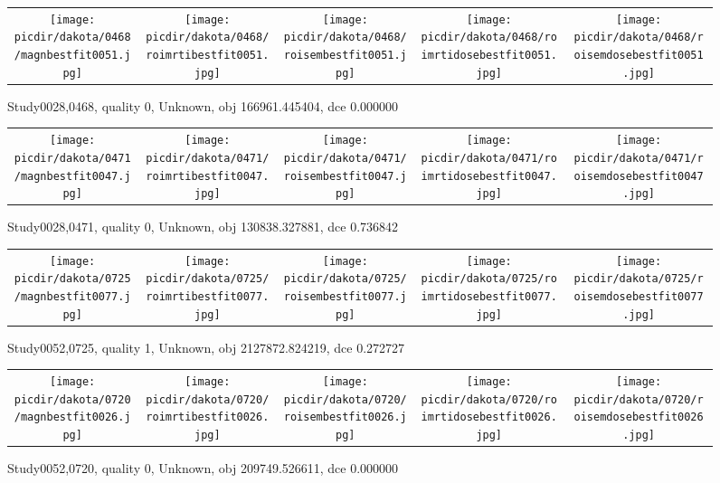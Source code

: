 \documentclass{article}
\newcommand{\picdir}{pdffig}
\begin{document}
\clearpage
\begin{figure} \begin{tabular}{ccccc} \scalebox{0.21}{\texttt{[image: \\picdir/dakota/0468/magnbestfit0051.jpg]}} & \scalebox{0.21}{\texttt{[image: \\picdir/dakota/0468/roimrtibestfit0051.jpg]}} & \scalebox{0.21}{\texttt{[image: \\picdir/dakota/0468/roisembestfit0051.jpg]}}  & \scalebox{0.21}{\texttt{[image: \\picdir/dakota/0468/roimrtidosebestfit0051.jpg]}} & \scalebox{0.21}{\texttt{[image: \\picdir/dakota/0468/roisemdosebestfit0051.jpg]}} \end{tabular} \caption{Study0028,0468, quality 0, Unknown, obj 166961.445404, dce 0.000000  } \label{Study00280468} \end{figure}
\begin{figure} \begin{tabular}{ccccc} \scalebox{0.21}{\texttt{[image: \\picdir/dakota/0471/magnbestfit0047.jpg]}} & \scalebox{0.21}{\texttt{[image: \\picdir/dakota/0471/roimrtibestfit0047.jpg]}} & \scalebox{0.21}{\texttt{[image: \\picdir/dakota/0471/roisembestfit0047.jpg]}}  & \scalebox{0.21}{\texttt{[image: \\picdir/dakota/0471/roimrtidosebestfit0047.jpg]}} & \scalebox{0.21}{\texttt{[image: \\picdir/dakota/0471/roisemdosebestfit0047.jpg]}} \end{tabular} \caption{Study0028,0471, quality 0, Unknown, obj 130838.327881, dce 0.736842  } \label{Study00280471} \end{figure}
\begin{figure} \begin{tabular}{ccccc} \scalebox{0.21}{\texttt{[image: \\picdir/dakota/0725/magnbestfit0077.jpg]}} & \scalebox{0.21}{\texttt{[image: \\picdir/dakota/0725/roimrtibestfit0077.jpg]}} & \scalebox{0.21}{\texttt{[image: \\picdir/dakota/0725/roisembestfit0077.jpg]}}  & \scalebox{0.21}{\texttt{[image: \\picdir/dakota/0725/roimrtidosebestfit0077.jpg]}} & \scalebox{0.21}{\texttt{[image: \\picdir/dakota/0725/roisemdosebestfit0077.jpg]}} \end{tabular} \caption{Study0052,0725, quality 1, Unknown, obj 2127872.824219, dce 0.272727  } \label{Study00520725} \end{figure}
\begin{figure} \begin{tabular}{ccccc} \scalebox{0.21}{\texttt{[image: \\picdir/dakota/0720/magnbestfit0026.jpg]}} & \scalebox{0.21}{\texttt{[image: \\picdir/dakota/0720/roimrtibestfit0026.jpg]}} & \scalebox{0.21}{\texttt{[image: \\picdir/dakota/0720/roisembestfit0026.jpg]}}  & \scalebox{0.21}{\texttt{[image: \\picdir/dakota/0720/roimrtidosebestfit0026.jpg]}} & \scalebox{0.21}{\texttt{[image: \\picdir/dakota/0720/roisemdosebestfit0026.jpg]}} \end{tabular} \caption{Study0052,0720, quality 0, Unknown, obj 209749.526611, dce 0.000000  } \label{Study00520720} \end{figure}
\end{document}
